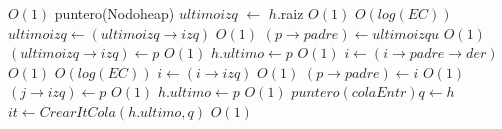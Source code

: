 \begin{Algoritmos}
\begin{algorithmic}[1]
    					\EndWhile
    					 \Comment $O(1)$
    						\State puntero(Nodoheap) $ultimoizq$ $\gets$ $h$.raiz \Comment $O(1)$
    						 \Comment $O(log(EC))$
    							\State $ultimoizq \gets (ultimoizq \rightarrow izq)$ \Comment $O(1)$
    						\EndWhile
    						\State $(p \rightarrow padre) \gets ultimoizqu$ \Comment $O(1)$
    						\State $(ultimoizq \rightarrow izq) \gets p$ \Comment $O(1)$
    						\State $h.ultimo \gets p$ \Comment $O(1)$
    					\Else
    						\State $i \gets (i \rightarrow padre \rightarrow der)$ \Comment $O(1)$
    						 \Comment $O(log(EC))$
    							\State $i \gets (i \rightarrow izq)$ \Comment $O(1)$
    						\EndWhile
    						\State $(p \rightarrow padre) \gets i$ \Comment $O(1)$
    						\State $(j \rightarrow izq) \gets p$ \Comment $O(1)$
    						\State $h.ultimo \gets p$ \Comment $O(1)$
    					\EndIf
    				\EndIf		
    			\EndIf	    	
	    	\EndIf
		\EndIf
		\State $puntero(colaEntr) q \gets h$
		\State $it \gets CrearItCola(h.ultimo, q)$ \Comment $O(1)$


\end{algorithmic}
\end{Algoritmos}
